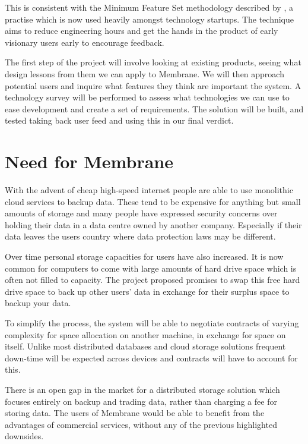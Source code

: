 \documentclass[11pt, a4paper, twoside]{report}
\begin{document}
This is consistent with the Minimum Feature Set methodology described by \cite{blank2010mfs}, a practise which is now used heavily amongst technology startups. The technique aims to reduce engineering hours and get the hands in the product of early visionary users early to encourage feedback.

The first step of the project will involve looking at existing products, seeing what design lessons from them we can apply to Membrane. We will then approach potential users and inquire what features they think are important the system. A technology survey will be performed to assess what technologies we can use to ease development and create a set of requirements. The solution will be built, and tested taking back user feed and using this in our final verdict.

\section{Need for Membrane}

With the advent of cheap high-speed internet people are able to use monolithic cloud services to backup data. These tend to be expensive for anything but small amounts of storage and many people have expressed security concerns over holding their data in a data centre owned by another company. \citep{batters2010dbsecurity} Especially if their data leaves the users country where data protection laws may be different.

Over time personal storage capacities for users have also increased. It is now common for computers to come with large amounts of hard drive space which is often not filled to capacity. The project proposed promises to swap this free hard drive space to back up other users’ data in exchange for their surplus space to backup your data.

To simplify the process, the system will be able to negotiate contracts of varying complexity for space allocation on another machine, in exchange for space on itself. Unlike most distributed databases and cloud storage solutions frequent down-time will be expected across devices and contracts will have to account for this.

There is an open gap in the market for a distributed storage solution which focuses entirely on backup and trading data, rather than charging a fee for storing data. The users of Membrane would be able to benefit from the advantages of commercial services, without any of the previous highlighted downsides.
\end{document}
